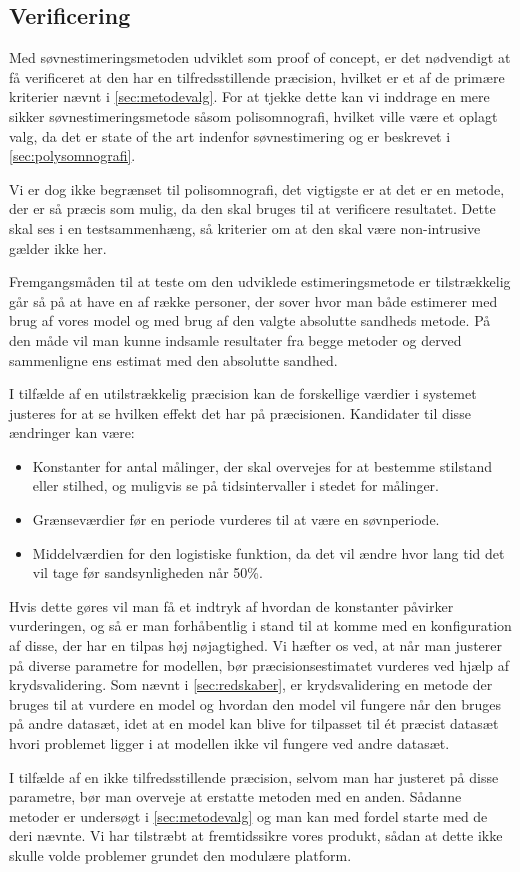 \subsection{Verificering}
Med søvnestimeringsmetoden udviklet som proof of concept, er det nødvendigt at få verificeret at den har en tilfredsstillende præcision, hvilket er et af de primære kriterier nævnt i \cref{sec:metodevalg}.
For at tjekke dette kan vi inddrage en mere sikker søvnestimeringsmetode såsom polisomnografi, hvilket ville være et oplagt valg, da det er state of the art indenfor søvnestimering og er beskrevet i \cref{sec:polysomnografi}.

Vi er dog ikke begrænset til polisomnografi, det vigtigste er at det er en metode, der er så præcis som mulig, da den skal bruges til at verificere resultatet.
Dette skal ses i en testsammenhæng, så kriterier om at den skal være non-intrusive gælder ikke her.

Fremgangsmåden til at teste om den udviklede estimeringsmetode er tilstrækkelig går så på at have en af række personer, der sover hvor man både estimerer med brug af vores model og med brug af den valgte absolutte sandheds metode.
På den måde vil man kunne indsamle resultater fra begge metoder og derved sammenligne ens estimat med den absolutte sandhed.

I tilfælde af en utilstrækkelig præcision kan de forskellige værdier i systemet justeres for at se hvilken effekt det har på præcisionen.
Kandidater til disse ændringer kan være:
\begin{itemize}
	\item Konstanter for antal målinger, der skal overvejes for at bestemme stilstand eller stilhed, og muligvis se på tidsintervaller i stedet for målinger.
	\item Grænseværdier før en periode vurderes til at være en søvnperiode.
	\item Middelværdien for den logistiske funktion, da det vil ændre hvor lang tid det vil tage før sandsynligheden når 50\%.
\end{itemize} 

Hvis dette gøres vil man få et indtryk af hvordan de konstanter påvirker vurderingen, og så er man forhåbentlig i stand til at komme med en konfiguration af disse, der har en tilpas høj nøjagtighed.
Vi hæfter os ved, at når man justerer på diverse parametre for modellen, bør præcisionsestimatet vurderes ved hjælp af krydsvalidering.
Som nævnt i \cref{sec:redskaber}, er krydsvalidering en metode der bruges til at vurdere en model og hvordan den model vil fungere når den bruges på andre datasæt, idet at en model kan blive for tilpasset til ét præcist datasæt hvori problemet ligger i at modellen ikke vil fungere ved andre datasæt.

I tilfælde af en ikke tilfredsstillende præcision, selvom man har justeret på disse parametre, bør man overveje at erstatte metoden med en anden.
Sådanne metoder er undersøgt i \cref{sec:metodevalg} og man kan med fordel starte med de deri nævnte.
Vi har tilstræbt at fremtidssikre vores produkt, sådan at dette ikke skulle volde problemer grundet den modulære platform.